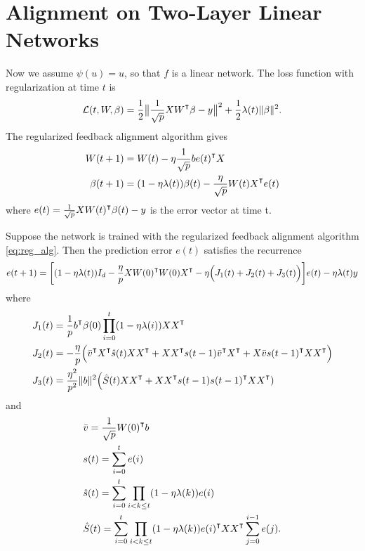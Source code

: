 \section{Alignment on Two-Layer Linear Networks}\label{sec:appendix-alignment}

Now we assume $\psi(u) = u$, so that $f$ is a linear network. The loss function with regularization at time $t$ is
\begin{equation}
\label{eq:reg_loss}
\Loss(t, W, \beta) = \frac{1}{2}\big\|\frac{1}{\sqrt p}XW\transpose\beta-y\big\|^2 + \frac{1}{2}\lambda(t)\|\beta\|^2.
\end{equation}
The regularized feedback alignment algorithm gives
\begin{equation}
\label{eq:reg_alg}
\begin{aligned}
    W(t+1) &= W(t) - \eta\frac{1}{\sqrt p}b e(t)\transpose X\\
    \beta(t+1) &= (1-\eta\lambda(t))\beta(t)- \frac{\eta}{\sqrt p} W(t)X\transpose e(t)
\end{aligned}
\end{equation}
where $e(t)=\frac{1}{\sqrt p}XW(t)\transpose \beta(t)-y$ is the error vector at time t.


\begin{lemma}
\label{lma:one_step_update}
Suppose the network is trained with the regularized feedback alignment algorithm \eqref{eq:reg_alg}. Then the prediction error $e(t)$ satisfies the recurrence
\begin{equation}
\label{eq:err_update}
\begin{aligned}
    e(t+1) = \bigg[(1-\eta\lambda(t))I_d - \frac{\eta}{p}XW(0)\transpose W(0)X\transpose -\eta\Big(J_1(t)+J_2(t)+J_3(t)\Big)\bigg]e(t) -\eta\lambda(t)y
\end{aligned}
\end{equation}
where
\begin{equation*}
\begin{aligned}
&J_1(t) = \frac{1}{p}b\transpose\beta(0)\prod_{i=0}^{t}(1-\eta\lambda(i))XX\transpose \\
&J_2(t) = -\frac{\eta}{p}\Big(\bar{v}\transpose X\transpose \hat{s}(t) XX\transpose+ XX\transpose s(t-1)\bar{v}\transpose X\transpose + X \bar{v}s(t-1)\transpose XX\transpose\Big) \\
&J_3(t) = \frac{\eta^2}{p^2}\|b\|^2\Big(\hat{S}(t)XX\transpose + XX\transpose s(t-1)s(t-1)\transpose XX\transpose)
\end{aligned}
\end{equation*}
and
\begin{equation*}
\begin{aligned}
&\bar{v} = \frac{1}{\sqrt p}W(0)\transpose b \\
&s(t) = \sum_{i=0}^{t}e(i) \\
&\hat{s}(t) = \sum_{i=0}^{t}\prod_{i<k\leq t}(1-\eta\lambda(k)) e(i) \\
&\hat{S}(t) = \sum_{i=0}^{t}\prod_{i<k\leq t}(1-\eta\lambda(k))e(i)\transpose XX\transpose \sum_{j=0}^{i-1}e(j).
\end{aligned}
\end{equation*}
\end{lemma}

